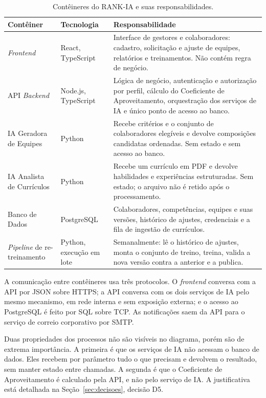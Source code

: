 \documentclass[a4paper,12pt,oneside,openany]{book}
\begin{document}
\begin{table}[H]
\centering
\small
\caption{Contêineres do RANK-IA e suas responsabilidades.}
\label{tab:conteineres}
\begin{tabularx}{0.97\textwidth}{p{} p{} X}
\toprule
\textbf{Contêiner} & \textbf{Tecnologia} & \textbf{Responsabilidade} \\
\midrule
\textit{Frontend} & React, TypeScript & Interface de gestores e colaboradores:
cadastro, solicitação e ajuste de equipes, relatórios e treinamentos. Não
contém regra de negócio. \\
API \textit{Backend} & Node.js, TypeScript & Lógica de negócio, autenticação e
autorização por perfil, cálculo do Coeficiente de Aproveitamento, orquestração
dos serviços de IA e único ponto de acesso ao banco. \\
IA Geradora de Equipes & Python & Recebe critérios e o conjunto de
colaboradores elegíveis e devolve composições candidatas ordenadas. Sem estado
e sem acesso ao banco. \\
IA Analista de Currículos & Python & Recebe um currículo em PDF e devolve
habilidades e experiências estruturadas. Sem estado; o arquivo não é retido
após o processamento. \\
Banco de Dados & PostgreSQL & Colaboradores, competências, equipes e suas
versões, histórico de ajustes, credenciais e a fila de ingestão de currículos. \\
\textit{Pipeline} de re-treinamento & Python, execução em lote & Semanalmente:
lê o histórico de ajustes, monta o conjunto de treino, treina, valida a nova
versão contra a anterior e a publica. \\
\bottomrule
\end{tabularx}
\end{table}

A comunicação entre contêineres usa três protocolos. O \textit{frontend}
conversa com a API por JSON sobre HTTPS; a API conversa com os dois serviços de
IA pelo mesmo mecanismo, em rede interna e sem exposição externa; e o acesso ao
PostgreSQL é feito por SQL sobre TCP. As notificações saem da API para o
serviço de correio corporativo por SMTP.

Duas propriedades dos processos não são visíveis no diagrama, porém são de extrema
importância. A primeira é que os serviços de IA não acessam o banco de dados. Eles
recebem por parâmetro tudo o que precisam e devolvem o resultado, sem manter
estado entre chamadas. A segunda é que o Coeficiente de Aproveitamento é calculado pela API,
e não pelo serviço de IA. A justificativa está detalhada na Seção~\ref{sec:decisoes}, decisão D5.
\end{document}
